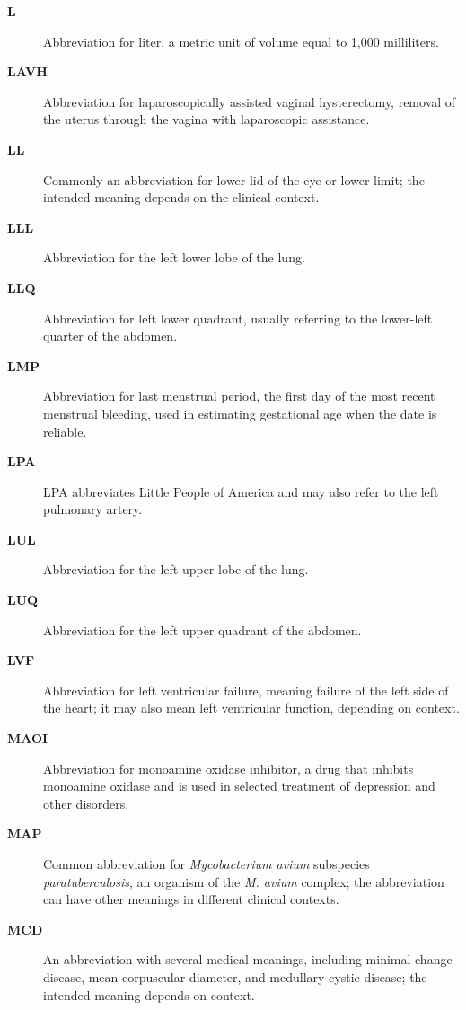 \begin{description}
\item[\textbf{L}] Abbreviation for liter, a metric unit of volume equal to 1,000 milliliters.

\item[\textbf{LAVH}] Abbreviation for laparoscopically assisted vaginal hysterectomy, removal of the uterus through the vagina with laparoscopic assistance.

\item[\textbf{LL}] Commonly an abbreviation for lower lid of the eye or lower limit; the intended meaning depends on the clinical context.

\item[\textbf{LLL}] Abbreviation for the left lower lobe of the lung.

\item[\textbf{LLQ}] Abbreviation for left lower quadrant, usually referring to the lower-left quarter of the abdomen.

\item[\textbf{LMP}] Abbreviation for last menstrual period, the first day of the most recent menstrual bleeding, used in estimating gestational age when the date is reliable.

\item[\textbf{LPA}] LPA abbreviates Little People of America and may also refer to the left pulmonary artery.

\item[\textbf{LUL}] Abbreviation for the left upper lobe of the lung.

\item[\textbf{LUQ}] Abbreviation for the left upper quadrant of the abdomen.

\item[\textbf{LVF}] Abbreviation for left ventricular failure, meaning failure of the left side of the heart; it may also mean left ventricular function, depending on context.

\item[\textbf{MAOI}] Abbreviation for monoamine oxidase inhibitor, a drug that inhibits monoamine oxidase and is used in selected treatment of depression and other disorders.

\item[\textbf{MAP}] Common abbreviation for \textit{Mycobacterium avium} subspecies \textit{paratuberculosis}, an organism of the \textit{M. avium} complex; the abbreviation can have other meanings in different clinical contexts.

\item[\textbf{MCD}] An abbreviation with several medical meanings, including minimal change disease, mean corpuscular diameter, and medullary cystic disease; the intended meaning depends on context.


\end{description}
